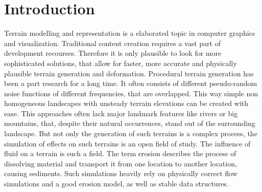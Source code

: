 \section{Introduction}
Terrain modelling  and representation is a elaborated topic in computer graphics and visualization. Traditional content creation requires a vast part of development recourses. Therefore it is only plausible to look for more sophisticated solutions, that allow for faster, more accurate and physically plausible terrain generation and deformation. Procedural terrain generation has been a part research for a long time. It often consists of different pseudo-random noise functions of different frequencies, that are overlapped. This way simple non homogeneous landscapes with unsteady terrain elevations can be created with ease. This approaches often lack major landmark features like rivers or big mountains, that, despite their natural occurrences, stand out of the surrounding landscape. But not only the generation of such terrains is a complex process, the simulation of effects on such terrains is an open field of study. The influence of fluid on a terrain is such a field. The term erosion describes the process of dissolving material and transport it from one location to another location, causing sediments. Such simulations heavily rely on physically correct flow simulations and a good erosion model, as well as stable data structures. 

